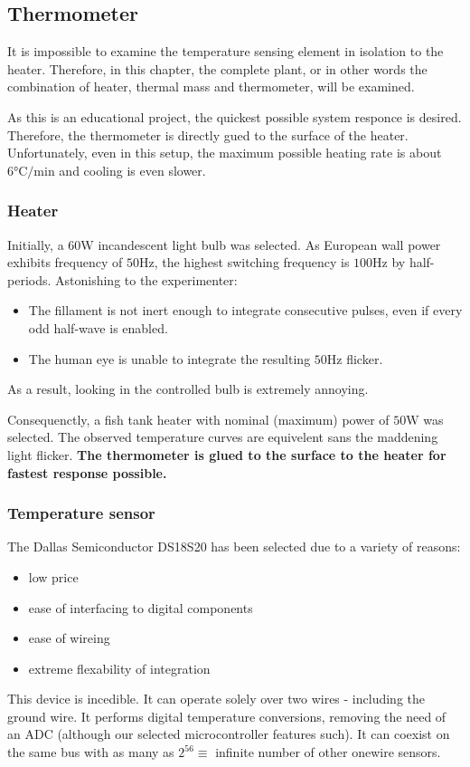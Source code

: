 \subsection{Thermometer}
It is impossible to examine the temperature sensing element in isolation to the heater.
Therefore, in this chapter, the complete plant, or in other words the combination of heater, thermal mass and thermometer, will be examined.
\par
As this is an educational project, the quickest possible system responce is desired.
Therefore, the thermometer is directly gued to the surface of the heater.
Unfortunately, even in this setup, the maximum possible heating rate is about $6\si{\celsius}/\si{\minute}$ and cooling is even slower.

\subsubsection{Heater}
Initially, a $60\si{\watt}$ incandescent light bulb was selected.
As European wall power exhibits frequency of $50\si{\hertz}$, the highest switching frequency is $100\si{\hertz}$ by half-periods.
Astonishing to the experimenter:
\begin{itemize}
\item{The fillament is not inert enough to integrate consecutive pulses, even if every odd half-wave is enabled.}
\item{The human eye is unable to integrate the resulting $50\si{\hertz}$ flicker.}
\end{itemize}
As a result, looking in the controlled bulb is extremely annoying.
\par
Consequenctly, a fish tank heater with nominal (maximum) power of $50\si{\watt}$ was selected.
The observed temperature curves are equivelent sans the maddening light flicker.
\textbf{The thermometer is glued to the surface to the heater for fastest response possible.}

\subsubsection{Temperature sensor}
The Dallas Semiconductor DS18S20 has been selected due to a variety of reasons:
\begin{itemize}
\item{low price}
\item{ease of interfacing to digital components}
\item{ease of wireing}
\item{extreme flexability of integration}
\end{itemize}
This device is incedible.
It can operate solely over two wires - including the ground wire.
It performs digital temperature conversions, removing the need of an ADC (although our selected microcontroller features such).
It can coexist on the same bus with as many as $2^{56}\equiv$ infinite number of other onewire sensors.

